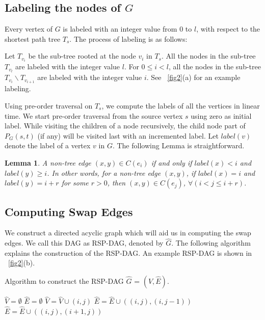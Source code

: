 \documentclass[11pt,a4paper]{llncs}
\newtheorem{lem}[thm]{Lemma}
\begin{document}
\subsection{Labeling the nodes of $G$}
\label{labeling}
Every vertex of $G$ is labeled with an integer value from $0$ to $l$, with
respect to the shortest path tree $T_{s}$. The process of labeling is as follows:

Let $T_{v_{i}}$ be the sub-tree rooted at the node $v_{i}$ in $T_{s}$.
All the nodes in the sub-tree $T_{v_{l}}$ are labeled with the integer value $l$.
For $0 \leq i < l$, all the nodes in the sub-tree $T_{v_{i}} \backslash T_{v_{i+1}}$
are labeled with the integer value $i$. See \figurename~\ref{fig2}(a) for an example labeling.

Using pre-order traversal on $T_{s}$, we compute the labels of all the vertices in linear time.
We start pre-order traversal from the source vertex $s$ using zero as initial label.
While visiting the children of a node recursively, the child node part of $P_{G}(s,t)$ (if any)
will be visited last with an incremented label.
Let $label(v)$ denote the label of a vertex $v$ in $G$. The following Lemma is straightforward.

\begin{lem}
\label{lemmalabel1}
A non-tree edge $(x,y) \in C(e_{i})$ if and only if $label(x) < i$ and $label(y) \geq i$.
In other words, for a non-tree edge $(x,y)$, if $label(x) = i$ and $label(y) = i + r$
for some $r > 0$, then $(x,y) \in C(e_{j})$, $\forall (i < j \leq i + r)$.
\end{lem}
\subsection{Computing Swap Edges}
We construct a directed acyclic graph which will aid us in computing the swap edges.
We call this DAG as RSP-DAG, denoted by $\widehat{G}$.
The following algorithm explains the construction of the RSP-DAG.
An example RSP-DAG is shown in \figurename~\ref{fig2}(b).

\begin{algorithm}[H]
    \caption{Algorithm to construct the RSP-DAG $\widehat{G}$ = $(\widehat{V},\widehat{E})$.}
    \label{rspdag}
    \begin{algorithmic}[1]
    \STATE $\widehat{V} = \emptyset$
    \STATE $\widehat{E} = \emptyset$
           \STATE $\widehat{V} = \widehat{V} \cup (i,j)$
        \ENDFOR
    \ENDFOR
            \STATE $\widehat{E} = \widehat{E} \cup ((i,j), (i,j-1))$
            \STATE $\widehat{E} = \widehat{E} \cup ((i,j), (i+1,j))$
        \ENDIF
    \ENDFOR
    \end{algorithmic}
\end{algorithm}
\end{document}
